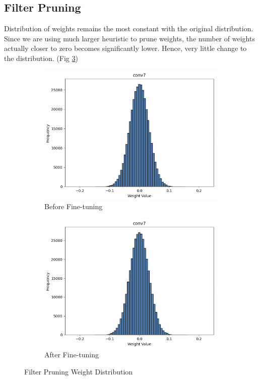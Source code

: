 \documentclass[12pt]{article}
\begin{document}
\subsection{Filter Pruning}
Distribution of weights remains the most constant with the original distribution. Since we are using much larger heuristic to prune weights, the number of weights actually closer to zero becomes significantly lower. Hence, very little change to the distribution. (Fig \ref{fig:filter_w_dis})


\begin{figure}[h]
\centering
\begin{subfigure}{.5\textwidth}
  \centering
  \includegraphics[width=1\linewidth]{report_images/filter_w_dist_pp.png}
  \caption{Before Fine-tuning}
  \label{fig:filter_dis_tt}
\end{subfigure}%
\begin{subfigure}{.5\textwidth}
  \centering
  \includegraphics[width=1\linewidth]{report_images/filter_w_dist_ft.png}
  \caption{After Fine-tuning}
  \label{fig:filter_dis_ft}
\end{subfigure}
\caption{Filter Pruning Weight Distribution}
\label{fig:filter_w_dis}
\end{figure}
\FloatBarrier
\end{document}
